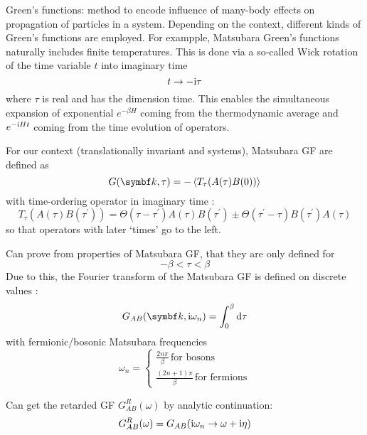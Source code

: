 \documentclass[../notes.tex]{subfiles}
\begin{document}

Green's functions: method to encode influence of many-body effects on propagation of particles in a system.
Depending on the context, different kinds of Green's functions are employed.
For exampple, Matsubara Green's functions naturally includes finite temperatures.
This is done via a so-called Wick rotation of the time variable \(t\) into imaginary time
\begin{equation}
	t \to -\mathrm{i} \tau
\end{equation}
where \(\tau\) is real and has the dimension time.
This enables the simultaneous expansion of exponential \(e^{-\beta H}\) coming from the thermodynamic average and \(e^{-\mathrm{i} H t}\) coming from the time evolution of operators.

For our context (translationally invariant and systems), Matsubara GF are defined as
\begin{equation}
	G (\vb{k}, \tau) = - \Braket{T_{\tau} (A(\tau) B(0))}
\end{equation}
with time-ordering operator in imaginary time :
\begin{equation}
	T_{\tau} (A(\tau) B(\tau^{\prime})) = \Theta(\tau - \tau^{\prime}) A(\tau) B(\tau^{\prime}) \pm \Theta(\tau^{\prime} - \tau) B(\tau^{\prime}) A(\tau)
\end{equation}
so that operators with later `times' go to the left.

Can prove from properties of Matsubara GF, that they are only defined for
\begin{equation}
	-\beta < \tau < \beta
\end{equation}
Due to this, the Fourier transform of the Matsubara GF is defined on discrete values :
\begin{equation}
	G_{A B} (\vb{k}, \iu \omega_n) = \int_{0}^{\beta} \odif{\tau}
\end{equation}
with fermionic/bosonic Matsubara frequencies
\begin{equation}
	\omega_n =
	\begin{cases}
		\frac{2n \pi}{\beta} \, \text{for bosons} \\
		\frac{(2n + 1)\pi}{\beta} \, \text{for fermions}
	\end{cases}
\end{equation}

Can get the retarded GF \(G_{AB}^R (\omega)\) by analytic continuation:
\begin{equation}
	G_{AB}^R (\omega) = G_{AB} (\mathrm{i} \omega_n \to \omega + \mathrm{i} \eta)
\end{equation}
\end{document}
